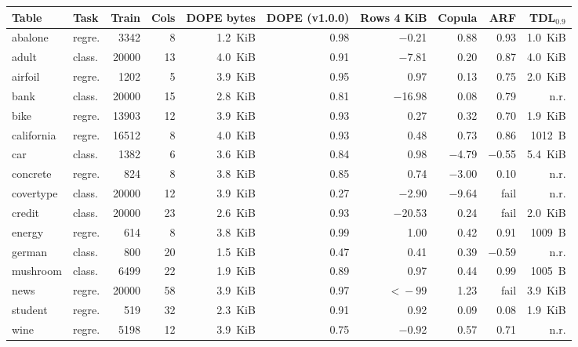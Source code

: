 \begin{tabular}{llrrrrrrrr}
\toprule
Table & Task & Train & Cols & DOPE bytes & DOPE (v1.0.0) & Rows 4 KiB & Copula & ARF & TDL$_{0.9}$ \\
\midrule
abalone & regre. & 3342 & 8 & 1.2~KiB & 0.98 & \ensuremath{-}0.21 & 0.88 & 0.93 & 1.0~KiB \\
adult & class. & 20000 & 13 & 4.0~KiB & 0.91 & \ensuremath{-}7.81 & 0.20 & 0.87 & 4.0~KiB \\
airfoil & regre. & 1202 & 5 & 3.9~KiB & 0.95 & 0.97 & 0.13 & 0.75 & 2.0~KiB \\
bank & class. & 20000 & 15 & 2.8~KiB & 0.81 & \ensuremath{-}16.98 & 0.08 & 0.79 & n.r. \\
bike & regre. & 13903 & 12 & 3.9~KiB & 0.93 & 0.27 & 0.32 & 0.70 & 1.9~KiB \\
california & regre. & 16512 & 8 & 4.0~KiB & 0.93 & 0.48 & 0.73 & 0.86 & 1012~B \\
car & class. & 1382 & 6 & 3.6~KiB & 0.84 & 0.98 & \ensuremath{-}4.79 & \ensuremath{-}0.55 & 5.4~KiB \\
concrete & regre. & 824 & 8 & 3.8~KiB & 0.85 & 0.74 & \ensuremath{-}3.00 & 0.10 & n.r. \\
covertype & class. & 20000 & 12 & 3.9~KiB & 0.27 & \ensuremath{-}2.90 & \ensuremath{-}9.64 & fail & n.r. \\
credit & class. & 20000 & 23 & 2.6~KiB & 0.93 & \ensuremath{-}20.53 & 0.24 & fail & 2.0~KiB \\
energy & regre. & 614 & 8 & 3.8~KiB & 0.99 & 1.00 & 0.42 & 0.91 & 1009~B \\
german & class. & 800 & 20 & 1.5~KiB & 0.47 & 0.41 & 0.39 & \ensuremath{-}0.59 & n.r. \\
mushroom & class. & 6499 & 22 & 1.9~KiB & 0.89 & 0.97 & 0.44 & 0.99 & 1005~B \\
news & regre. & 20000 & 58 & 3.9~KiB & 0.97 & $<\!-99$ & 1.23 & fail & 3.9~KiB \\
student & regre. & 519 & 32 & 2.3~KiB & 0.91 & 0.92 & 0.09 & 0.08 & 1.9~KiB \\
wine & regre. & 5198 & 12 & 3.9~KiB & 0.75 & \ensuremath{-}0.92 & 0.57 & 0.71 & n.r. \\
\bottomrule
\end{tabular}
